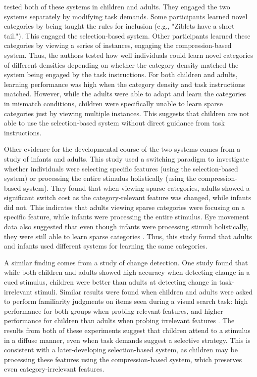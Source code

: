 \documentclass[../dissertation.tex]{subfiles}
\begin{document}
	\citet{Kloos2008} tested both of these systems in children and adults. They engaged the two systems separately by modifying task demands. Some participants learned novel categories by being taught the rules for inclusion (e.g., "Ziblets have a short tail."). This engaged the selection-based system. Other participants learned these categories by viewing a series of instances, engaging the compression-based system. Thus, the authors tested how well individuals could learn novel categories of different densities depending on whether the category density matched the system being engaged by the task instructions. For both children and adults, learning performance was high when the category density and task instructions matched. However, while the adults were able to adapt and learn the categories in mismatch conditions, children were specifically unable to learn sparse categories just by viewing multiple instances. This suggests that children are not able to use the selection-based system without direct guidance from task instructions. \par
	Other evidence for the developmental course of the two systems comes from a study of infants and adults. This study used a switching paradigm to investigate whether individuals were selecting specific features (using the selection-based system) or processing the entire stimulus holistically (using the compression-based system). They found that when viewing sparse categories, adults showed a significant switch cost as the category-relevant feature was changed, while infants did not. This indicates that adults viewing sparse categories were focusing on a specific feature, while infants were processing the entire stimulus. Eye movement data also suggested that even though infants were processing stimuli holistically, they were still able to learn sparse categories \citep{Best2013}. Thus, this study found that adults and infants used different systems for learning the same categories. \par
	A similar finding comes from a study of change detection. One study found that while both children and adults showed high accuracy when detecting change in a cued stimulus, children were better than adults at detecting change in task-irrelevant stimuli. Similar results were found when children and adults were asked to perform familiarity judgments on items seen during a visual search task: high performance for both groups when probing relevant features, and higher performance for children than adults when probing irrelevant features \citep{Plebanek2017}. The results from both of these experiments suggest that children attend to a stimulus in a diffuse manner, even when task demands suggest a selective strategy. This is consistent with a later-developing selection-based system, as children may be processing these features using the compression-based system, which preserves even category-irrelevant features. \par
\end{document}
